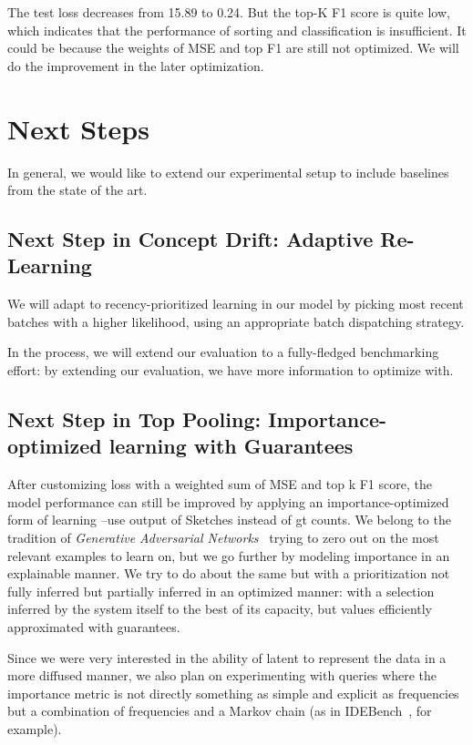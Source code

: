 The test loss decreases from 15.89 to 0.24. But the top-K F1 score is quite low, which indicates that the performance of sorting and classification is insufficient. It could be because the weights of MSE and top F1 are still not optimized. We will do the improvement in the later optimization.


\section{Next Steps}

In general, we would like to extend our experimental setup to include baselines from the state of the art.

\subsection{Next Step in Concept Drift: Adaptive Re-Learning}

We will adapt to recency-prioritized learning in our model by picking most recent batches with a higher likelihood, using an appropriate batch dispatching strategy.

In the process, we will extend our evaluation to a fully-fledged benchmarking effort: by extending our evaluation, we have more information to optimize with.


\subsection{Next Step in Top Pooling: Importance-optimized learning with Guarantees}

After customizing loss with a weighted sum of MSE and top k F1 score, the model performance can still be improved by applying an importance-optimized form of learning --use output of Sketches instead of gt counts. We belong to the tradition of \emph{Generative Adversarial Networks}~\cite{goodfellow2014generative} trying to zero out on the most relevant examples to learn on, but we go further by modeling importance in an explainable manner. We try to do about the same but with a prioritization not fully inferred but partially inferred in an optimized manner: with a selection inferred by the system itself to the best of its capacity, but values efficiently approximated with guarantees.

Since we were very interested in the ability of latent to represent the data in a more diffused manner, we also plan on experimenting with queries where the importance metric is not directly something as simple and explicit as frequencies but a combination of frequencies and a Markov chain (as in IDEBench~\cite{eichmann2020idebench}, for example).

